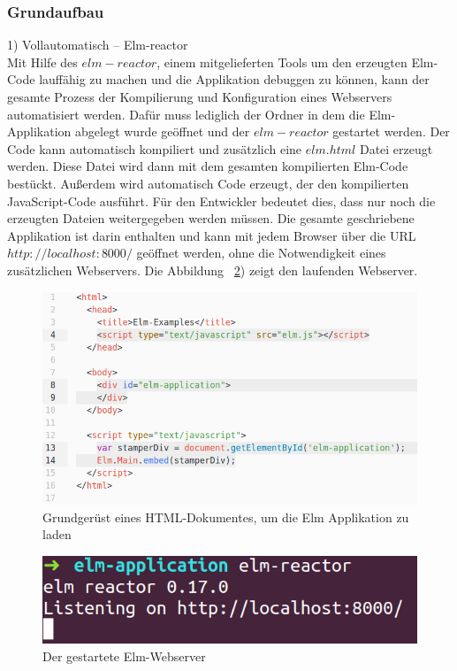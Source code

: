\subsubsection{Grundaufbau}
\label{sec:Grundaufbau}

1) Vollautomatisch – Elm-reactor\\
Mit Hilfe des $elm-reactor$, einem mitgelieferten Tools um den erzeugten Elm-Code lauffähig zu machen und die Applikation debuggen zu können, kann der gesamte Prozess der Kompilierung und Konfiguration eines Webservers automatisiert werden. Dafür muss lediglich der Ordner in dem die Elm-Applikation abgelegt wurde geöffnet und der $elm-reactor$ gestartet werden. 
Der Code kann automatisch kompiliert und zusätzlich eine $elm.html$ Datei erzeugt werden. Diese Datei wird dann mit dem gesamten kompilierten Elm-Code bestückt. Außerdem wird automatisch Code erzeugt, der den kompilierten JavaScript-Code ausführt. Für den Entwickler bedeutet dies, dass nur noch die erzeugten Dateien weitergegeben werden müssen. Die gesamte geschriebene Applikation ist darin enthalten und kann mit jedem Browser über die URL $http://localhost:8000/$ geöffnet werden, ohne die Notwendigkeit eines zusätzlichen Webservers. Die Abbildung ~\ref{fig:elm-reactor}) zeigt den laufenden Webserver.
\begin{figure}[hb]
\centering
\includegraphics[scale=0.4]{img/elm-make_include_in_index.png}
\caption{Grundgerüst eines HTML-Dokumentes, um die Elm Applikation zu laden}\label{fig:html-boilerplate}
\end{figure}
\begin{figure}[t]
\centering
\includegraphics[scale=0.4]{img/elm-reactor.png}
\caption{Der gestartete Elm-Webserver}\label{fig:elm-reactor}
\end{figure}
